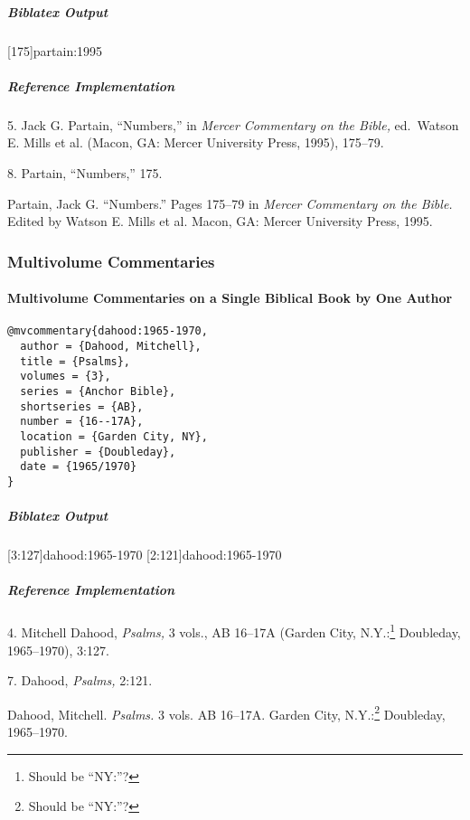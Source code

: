 \documentclass[a4paper]{article}
\newenvironment{biboutput}{%
  \subparagraph{Biblatex Output}
}{\color{black}}
\newenvironment{refimp}{%
  \subparagraph{Reference Implementation}
  \color{reference-colour}
  \rm
}{\par\color{black}}
\begin{document}
\begin{biboutput}
  [175]{partain:1995}
\end{biboutput}

\begin{refimp}
  5. Jack G. Partain, “Numbers,” in \emph{Mercer Commentary on the Bible,}
  ed.\ Watson E. Mills et al. (Macon, GA: Mercer University Press, 1995),
  175–79.

  8. Partain, “Numbers,” 175.

  \hangindent\bibindent Partain, Jack G. “Numbers.” Pages 175–79 in
  \emph{Mercer Commentary on the Bible.} Edited by Watson E. Mills et al.
  Macon, GA: Mercer University Press, 1995.
\end{refimp}

\subsubsection{Multivolume Commentaries}

\paragraph{Multivolume Commentaries on a Single Biblical Book by One Author}

\begin{lstlisting}
@mvcommentary{dahood:1965-1970,
  author = {Dahood, Mitchell},
  title = {Psalms},
  volumes = {3},
  series = {Anchor Bible},
  shortseries = {AB},
  number = {16--17A},
  location = {Garden City, NY},
  publisher = {Doubleday},
  date = {1965/1970}
}
\end{lstlisting}

\begin{biboutput}
  [3:127]{dahood:1965-1970}
  [2:121]{dahood:1965-1970}
\end{biboutput}

\begin{refimp}
  4. Mitchell Dahood, \emph{Psalms,} 3 vols., AB 16–17A (Garden City,
  N.Y.:\footnote{Should be “NY:”?} Doubleday, 1965–1970), 3:127.

  7. Dahood, \emph{Psalms,} 2:121.

  \hangindent\bibindent Dahood, Mitchell. \emph{Psalms.} 3 vols. AB 16–17A.
  Garden City, N.Y.:\footnote{Should be “NY:”?} Doubleday, 1965–1970.

\end{refimp}
\end{document}
